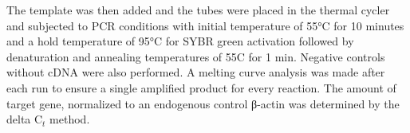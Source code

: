 \begin{refsection}
The template was then added and the tubes were placed in the thermal cycler and subjected to PCR conditions with  initial temperature of 55°C for 10 minutes and a hold temperature of 95°C for SYBR green activation followed by denaturation and annealing temperatures of 55C for 1 min. Negative controls without cDNA were also performed. A melting curve analysis was made after each run to ensure a single amplified product for every reaction. The amount of target gene, normalized to an endogenous control β-actin was determined by the delta C$_t$ method.

\clearpage
\printbibliography[heading=subbibintoc]
\end{refsection}
